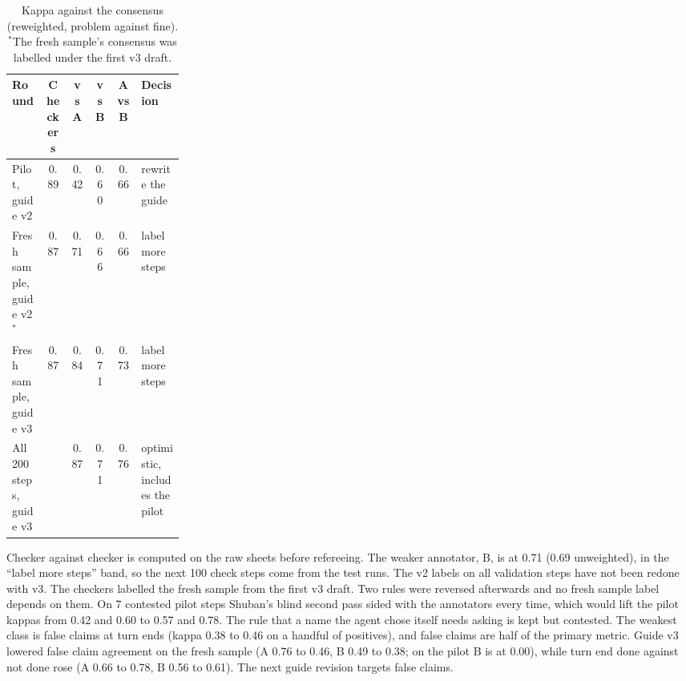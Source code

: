 \documentclass[10pt,a4paper]{article}
\newcommand{\tablestyle}{\footnotesize\rowcolors{2}{rowshade}{white}}
\begin{document}
\begin{table}[H]
\centering\tablestyle
\caption{Kappa against the consensus (reweighted, problem against fine). $^{*}$The fresh sample's consensus was labelled under the first v3 draft.}\label{tab:agreement}
\begin{tabularx}{\linewidth}{Ycccc P{0.25\linewidth}}
\toprule
\textbf{Round} & \textbf{Checkers} & \textbf{vs A} & \textbf{vs B} & \textbf{A vs B} & \textbf{Decision} \\
\midrule
Pilot, guide v2 & 0.89 & 0.42 & 0.60 & 0.66 & rewrite the guide \\
Fresh sample, guide v2$^{*}$ & 0.87 & 0.71 & 0.66 & 0.66 & label more steps \\
Fresh sample, guide v3 & 0.87 & 0.84 & 0.71 & 0.73 & label more steps \\
All 200 steps, guide v3 & & 0.87 & 0.71 & 0.76 & optimistic, includes the pilot \\
\bottomrule
\end{tabularx}
\end{table}
Checker against checker is computed on the raw sheets before refereeing. The weaker annotator, B, is at 0.71 (0.69 unweighted), in the ``label more steps'' band, so the next 100 check steps come from the test runs. The v2 labels on all validation steps have not been redone with v3. The checkers labelled the fresh sample from the first v3 draft. Two rules were reversed afterwards and no fresh sample label depends on them. On 7 contested pilot steps Shuban's blind second pass sided with the annotators every time, which would lift the pilot kappas from 0.42 and 0.60 to 0.57 and 0.78. The rule that a name the agent chose itself needs asking is kept but contested. The weakest class is false claims at turn ends (kappa 0.38 to 0.46 on a handful of positives), and false claims are half of the primary metric. Guide v3 lowered false claim agreement on the fresh sample (A 0.76 to 0.46, B 0.49 to 0.38; on the pilot B is at 0.00), while turn end done against not done rose (A 0.66 to 0.78, B 0.56 to 0.61). The next guide revision targets false claims.
\end{document}
